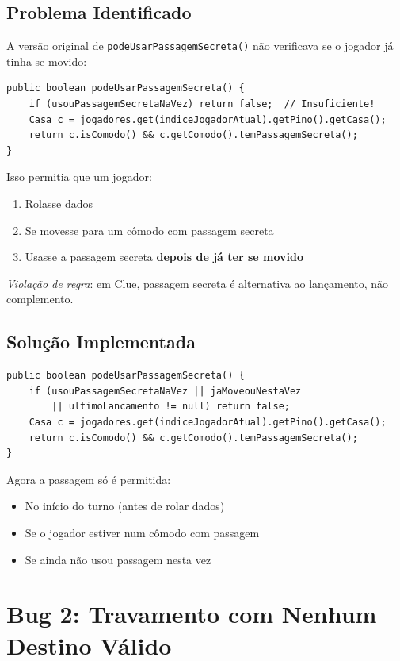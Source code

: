 \documentclass[12pt,a4paper]{report}
\begin{document}
\subsection{Problema Identificado}

A versão original de \texttt{podeUsarPassagemSecreta()} não verificava se o jogador já tinha se movido:

\begin{lstlisting}
public boolean podeUsarPassagemSecreta() {
    if (usouPassagemSecretaNaVez) return false;  // Insuficiente!
    Casa c = jogadores.get(indiceJogadorAtual).getPino().getCasa();
    return c.isComodo() && c.getComodo().temPassagemSecreta();
}
\end{lstlisting}

Isso permitia que um jogador:
\begin{enumerate}
    \item Rolasse dados
    \item Se movesse para um cômodo com passagem secreta
    \item Usasse a passagem secreta \textbf{depois de já ter se movido}
\end{enumerate}

\textit{Violação de regra}: em Clue, passagem secreta é alternativa ao lançamento, não complemento.

\subsection{Solução Implementada}

\begin{lstlisting}
public boolean podeUsarPassagemSecreta() {
    if (usouPassagemSecretaNaVez || jaMoveouNestaVez
        || ultimoLancamento != null) return false;
    Casa c = jogadores.get(indiceJogadorAtual).getPino().getCasa();
    return c.isComodo() && c.getComodo().temPassagemSecreta();
}
\end{lstlisting}

Agora a passagem só é permitida:
\begin{itemize}
    \item No início do turno (antes de rolar dados)
    \item Se o jogador estiver num cômodo com passagem
    \item Se ainda não usou passagem nesta vez
\end{itemize}

\section{Bug 2: Travamento com Nenhum Destino Válido}
\end{document}
